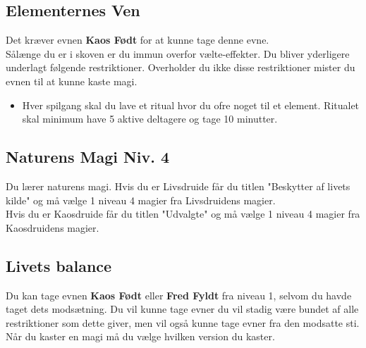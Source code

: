 \subsection{Elementernes Ven}
Det kræver evnen \textbf{Kaos Født} for at kunne tage denne evne.\\
Sålænge du er i skoven er du immun overfor vælte-effekter.
Du bliver yderligere underlagt følgende restriktioner. Overholder du ikke disse restriktioner mister du evnen til at kunne kaste magi.
\begin{itemize}
    \item Hver spilgang skal du lave et ritual hvor du ofre noget til et element. Ritualet skal minimum have 5 aktive deltagere og tage 10 minutter. 
\end{itemize}

\subsection{Naturens Magi Niv. 4}
Du lærer naturens magi. Hvis du er Livsdruide får du titlen "Beskytter af livets kilde" og må vælge 1 niveau 4 magier fra Livsdruidens magier.\\ Hvis du er Kaosdruide får du titlen "Udvalgte" og må vælge 1 niveau 4 magier fra Kaosdruidens magier.\\

\subsection{Livets balance}
Du kan tage evnen \textbf{Kaos Født} eller \textbf{Fred Fyldt} fra niveau 1, selvom du havde taget dets modsætning. Du vil kunne tage evner du vil stadig være bundet af alle restriktioner som dette giver, men vil også kunne tage evner fra den modsatte sti. Når du kaster en magi må du vælge hvilken version du kaster.